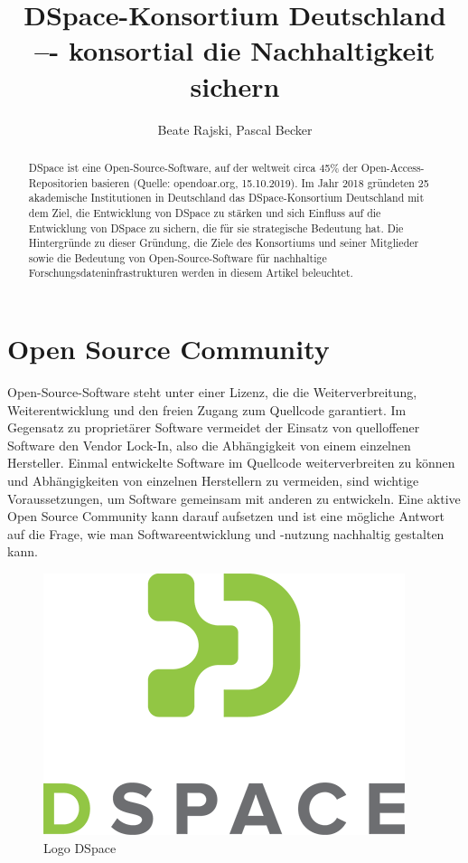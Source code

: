 \documentclass[a4paper,
fontsize=11pt,
oneside,
numbers=noperiodatend,
parskip=half-,
bibliography=totoc,
final
]{scrartcl}
\title{\LARGE{DSpace-Konsortium Deutschland –- konsortial die Nachhaltigkeit sichern}} %
\author{Beate Rajski, Pascal Becker} %
\date{}
\begin{document}
\maketitle
\thispagestyle{fancyplain} 

\begin{abstract}
\noindent
DSpace ist eine Open-Source-Software, auf der
weltweit circa 45\% der Open-Access-Repositorien basieren (Quelle:
opendoar.org, 15.10.2019). Im Jahr 2018 gründeten 25 akademische
Institutionen in Deutschland das DSpace-Konsortium Deutschland mit dem
Ziel, die Entwicklung von DSpace zu stärken und sich Einfluss auf die
Entwicklung von DSpace zu sichern, die für sie strategische Bedeutung
hat. Die Hintergründe zu dieser Gründung, die Ziele des Konsortiums und
seiner Mitglieder sowie die Bedeutung von Open-Source-Software für
nachhaltige Forschungsdateninfrastrukturen werden in diesem Artikel
beleuchtet.
\end{abstract}

\hypertarget{open-source-community}{%
\section{Open Source Community}\label{open-source-community}}

Open-Source-Software steht unter einer Lizenz, die die
Weiterverbreitung, Weiterentwicklung und den freien Zugang zum Quellcode
garantiert. Im Gegensatz zu proprietärer Software vermeidet der Einsatz
von quelloffener Software den Vendor Lock-In, also die Abhängigkeit von
einem einzelnen Hersteller. Einmal entwickelte Software im Quellcode
weiterverbreiten zu können und Abhängigkeiten von einzelnen Herstellern
zu vermeiden, sind wichtige Voraussetzungen, um Software gemeinsam mit
anderen zu entwickeln. Eine aktive Open Source Community kann darauf
aufsetzen und ist eine mögliche Antwort auf die Frage, wie man
Softwareentwicklung und -nutzung nachhaltig gestalten kann.

\begin{figure}
\centering
\includegraphics{img/DSpace_logo_17_sm.png}
\caption{Logo DSpace}
\end{figure}
\end{document}
